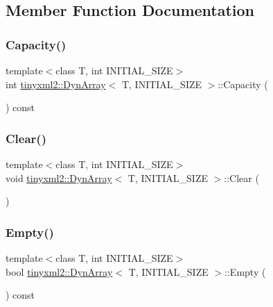 \subsection{Member Function Documentation}
\mbox{\label{classtinyxml2_1_1_dyn_array_a8e101fdf5b4248ac119d7dca6d0f5421}} 
\subsubsection{\texorpdfstring{Capacity()}{Capacity()}}
{\footnotesize\ttfamily template$<$class T, int I\+N\+I\+T\+I\+A\+L\+\_\+\+S\+I\+ZE$>$ \\
int \mbox{\hyperlink{classtinyxml2_1_1_dyn_array}{tinyxml2\+::\+Dyn\+Array}}$<$ T, I\+N\+I\+T\+I\+A\+L\+\_\+\+S\+I\+ZE $>$\+::Capacity (\begin{DoxyParamCaption}{ }\end{DoxyParamCaption}) const\hspace{0.3cm}{\ttfamily [inline]}}

\mbox{\label{classtinyxml2_1_1_dyn_array_af87a804cd831226d069274b44b74b8bc}} 
\subsubsection{\texorpdfstring{Clear()}{Clear()}}
{\footnotesize\ttfamily template$<$class T, int I\+N\+I\+T\+I\+A\+L\+\_\+\+S\+I\+ZE$>$ \\
void \mbox{\hyperlink{classtinyxml2_1_1_dyn_array}{tinyxml2\+::\+Dyn\+Array}}$<$ T, I\+N\+I\+T\+I\+A\+L\+\_\+\+S\+I\+ZE $>$\+::Clear (\begin{DoxyParamCaption}{ }\end{DoxyParamCaption})\hspace{0.3cm}{\ttfamily [inline]}}

\mbox{\label{classtinyxml2_1_1_dyn_array_a044fc26f44ed3e96ffaeac542188149e}} 
\subsubsection{\texorpdfstring{Empty()}{Empty()}}
{\footnotesize\ttfamily template$<$class T, int I\+N\+I\+T\+I\+A\+L\+\_\+\+S\+I\+ZE$>$ \\
bool \mbox{\hyperlink{classtinyxml2_1_1_dyn_array}{tinyxml2\+::\+Dyn\+Array}}$<$ T, I\+N\+I\+T\+I\+A\+L\+\_\+\+S\+I\+ZE $>$\+::Empty (\begin{DoxyParamCaption}{ }\end{DoxyParamCaption}) const\hspace{0.3cm}{\ttfamily [inline]}}

